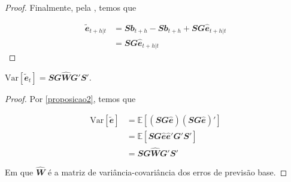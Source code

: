 \begin{apendicesenv}
\begin{proof}
  Finalmente, pela , temos que

  \begin{align}
    \mathbfit{\tilde{e}}_{t+h|t} &=  \mathbfit{Sb}_{t+h} - \mathbfit{Sb}_{t+h}  + \mathbfit{SG\hat{e}}_{t+h|t}  \\
    &= \mathbfit{SG\hat{e}}_{t+h|t}
  \end{align}
\end{proof}

\begin{proposition}
  \label{proposicao3}

  $\text{Var}[\mathbfit{\tilde{e}}_t] = \mathbfit{SG\hat{W}G'S'}$.

\end{proposition}

\begin{proof}
  Por \ref{proposicao2}, temos que

  \begin{align}
    \text{Var}[\mathbfit{\tilde{e}}] &= \mathbb{E}[\mathbfit{(SG\hat{e})(SG\hat {e})'}] \\
    &= \mathbb{E}[\mathbfit{SG\hat{e}\hat{e}'G'S'}] \\
    &= \mathbfit{SG\hat{W}G'S'}
  \end{align}

  Em que $\mathbfit{\hat{W}}$ é a matriz de variância-covariância dos erros de  previsão base.
\end{proof}

\end{apendicesenv}

